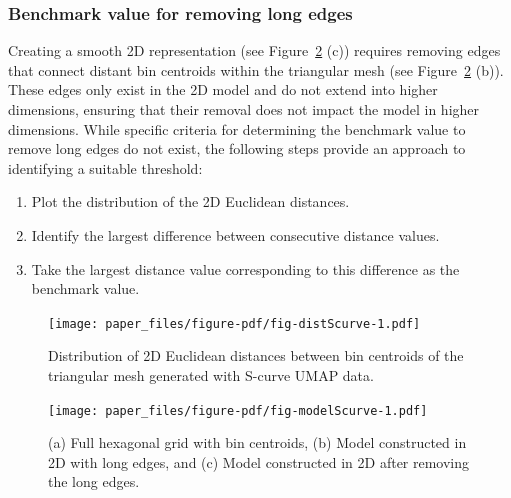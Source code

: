 \documentclass[
  12pt]{article}
\providecommand{\tightlist}{%
  \setlength{\itemsep}{0pt}\setlength{\parskip}{0pt}}\usepackage{longtable,booktabs,array}
\begin{document}
\hypertarget{benchmark-value-for-removing-long-edges}{%
\subsubsection{Benchmark value for removing long
edges}\label{benchmark-value-for-removing-long-edges}}

Creating a smooth 2D representation (see Figure~\ref{fig-modelScurve}
(c)) requires removing edges that connect distant bin centroids within
the triangular mesh (see Figure~\ref{fig-modelScurve} (b)). These edges
only exist in the 2D model and do not extend into higher dimensions,
ensuring that their removal does not impact the model in higher
dimensions. While specific criteria for determining the benchmark value
to remove long edges do not exist, the following steps provide an
approach to identifying a suitable threshold:

\begin{enumerate}
\def\labelenumi{\arabic{enumi}.}
\tightlist
\item
  Plot the distribution of the 2D Euclidean distances.
\item
  Identify the largest difference between consecutive distance values.
\item
  Take the largest distance value corresponding to this difference as
  the benchmark value.
\end{enumerate}

\begin{figure}[H]

{\centering \texttt{[image: paper\_files/figure-pdf/fig-distScurve-1.pdf]}

}

\caption{\label{fig-distScurve}Distribution of 2D Euclidean distances
between bin centroids of the triangular mesh generated with S-curve UMAP
data.}

\end{figure}

\begin{figure}[H]

{\centering \texttt{[image: paper\_files/figure-pdf/fig-modelScurve-1.pdf]}

}

\caption{\label{fig-modelScurve}(a) Full hexagonal grid with bin
centroids, (b) Model constructed in 2D with long edges, and (c) Model
constructed in 2D after removing the long edges.}

\end{figure}
\end{document}
